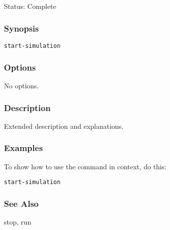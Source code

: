 \subsection{}
\label{start-simulation}
Status: Complete 
\subsubsection*{Synopsis}
\begin{verbatim}
start-simulation
\end{verbatim}
\subsubsection*{Options}
 No options. 
\subsubsection*{Description}
 Extended description and explanations. 
\subsubsection*{Examples}
 To show how to use the command in context, do this: \begin{verbatim}
start-simulation
\end{verbatim}
\subsubsection*{See Also}
 stop, run
